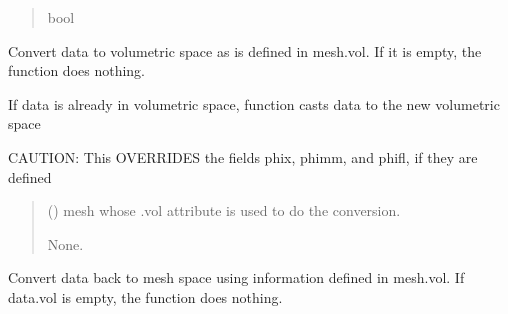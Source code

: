 \documentclass[letterpaper,10pt,english]{sphinxmanual}
\begin{document}
\begin{fulllineitems}
\begin{fulllineitems}
\begin{quote}
\begin{description}
\sphinxAtStartPar
bool

\end{description}\end{quote}

\end{fulllineitems}


\begin{fulllineitems}
\label{\detokenize{_autosummary/nirfasterff.base.data.FLdata:nirfasterff.base.data.FLdata.togrid}}
\pysigstartsignatures
\pysiglinewithargsret
{}
{}
{}
\pysigstopsignatures
\sphinxAtStartPar
Convert data to volumetric space as is defined in mesh.vol. If it is empty, the function does nothing.

\sphinxAtStartPar
If data is already in volumetric space, function casts data to the new volumetric space

\sphinxAtStartPar
CAUTION: This OVERRIDES the fields phix, phimm, and phifl, if they are defined
\begin{quote}\begin{description}
\sphinxAtStartPar
{} () \textendash{} mesh whose .vol attribute is used to do the conversion.

\sphinxAtStartPar
None.

\end{description}\end{quote}

\end{fulllineitems}


\begin{fulllineitems}
\label{\detokenize{_autosummary/nirfasterff.base.data.FLdata:nirfasterff.base.data.FLdata.tomesh}}
\pysigstartsignatures
\pysiglinewithargsret
{}
{}
{}
\pysigstopsignatures
\sphinxAtStartPar
Convert data back to mesh space using information defined in mesh.vol. If data.vol is empty, the function does nothing.


\end{fulllineitems}
\end{fulllineitems}
\end{document}
